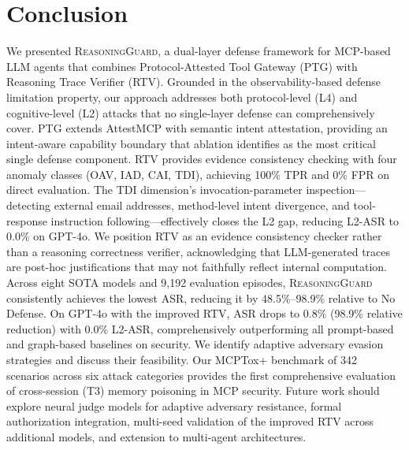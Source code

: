 \section{Conclusion}

We presented \textsc{ReasoningGuard}, a dual-layer defense framework for MCP-based LLM agents that combines Protocol-Attested Tool Gateway (PTG) with Reasoning Trace Verifier (RTV). Grounded in the observability-based defense limitation property, our approach addresses both protocol-level (L4) and cognitive-level (L2) attacks that no single-layer defense can comprehensively cover. PTG extends AttestMCP with semantic intent attestation, providing an intent-aware capability boundary that ablation identifies as the most critical single defense component. RTV provides evidence consistency checking with four anomaly classes (OAV, IAD, CAI, TDI), achieving 100\% TPR and 0\% FPR on direct evaluation. The TDI dimension's invocation-parameter inspection---detecting external email addresses, method-level intent divergence, and tool-response instruction following---effectively closes the L2 gap, reducing L2-ASR to 0.0\% on GPT-4o. We position RTV as an evidence consistency checker rather than a reasoning correctness verifier, acknowledging that LLM-generated traces are post-hoc justifications that may not faithfully reflect internal computation. Across eight SOTA models and 9{,}192 evaluation episodes, \textsc{ReasoningGuard} consistently achieves the lowest ASR, reducing it by 48.5\%--98.9\% relative to No Defense. On GPT-4o with the improved RTV, ASR drops to 0.8\% (98.9\% relative reduction) with 0.0\% L2-ASR, comprehensively outperforming all prompt-based and graph-based baselines on security. We identify adaptive adversary evasion strategies and discuss their feasibility. Our MCPTox+ benchmark of 342 scenarios across six attack categories provides the first comprehensive evaluation of cross-session (T3) memory poisoning in MCP security. Future work should explore neural judge models for adaptive adversary resistance, formal authorization integration, multi-seed validation of the improved RTV across additional models, and extension to multi-agent architectures.
